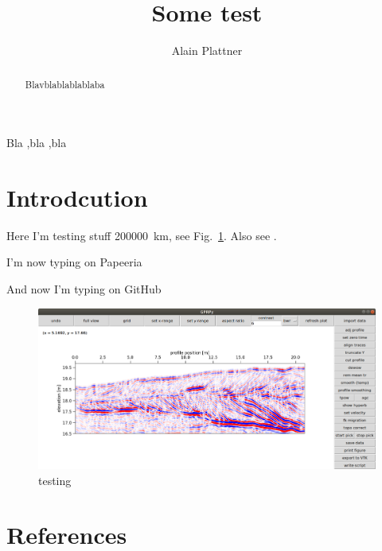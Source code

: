 \documentclass[authoryear,5p,times]{elsarticle}
\begin{document}
\begin{frontmatter}
  \title{Some test}

  \author[Alain]{Alain Plattner}
  \address[Alain]{Somewhere far away}

  \begin{abstract}
    Blavblablablablaba
  \end{abstract}

  \begin{keyword}
    Bla \sep bla \sep bla
  \end{keyword}
\end{frontmatter}

  
\section{Introdcution}

Here I'm testing stuff \SI{200000}{\kilo \meter}, see Fig.~\ref{bla}. Also see \cite{Peterson2525}.

I'm now typing on Papeeria

And now I'm typing on GitHub

\begin{figure}[h]
  \includegraphics[width=\textwidth]{Figures/profileGUI.png}
  \caption{\label{bla} testing}
\end{figure}


\section*{References}


\end{document}
